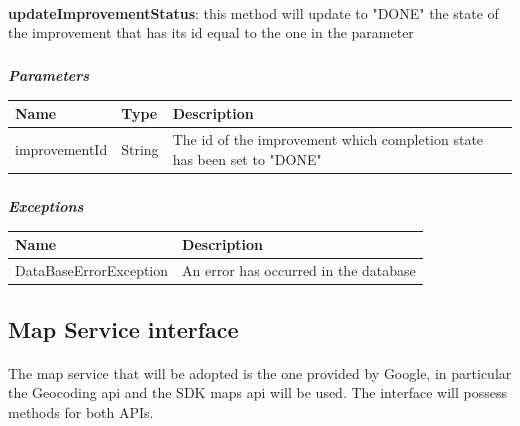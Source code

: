 						\paragraph{}
							\textbf{updateImprovementStatus}: this method will update to "DONE" the state of the improvement that has its id equal to the one in the parameter
							\subparagraph{}
							\vspace{-3mm}
							\textit{\textbf{Parameters}}
							\vspace{-2mm}
								\begin{table}[!h]
									\begin{tabular}{L{0.22\textwidth}L{0.15\textwidth}L{0.43\textwidth}}
										\toprule
										\textbf{Name} & \textbf{Type} & \textbf{Description} \\
										\midrule
								  		improvementId & String & The id of the improvement which completion state has been set to "DONE" \\
								 		\bottomrule
									\end{tabular}
								\end{table}
							\subparagraph{}
							\vspace{-6mm}
								\textit{\textbf{Exceptions}}
								\vspace{-2mm}
									\begin{table}[!h]
									\begin{tabular}{ll}
										\toprule
										\textbf{Name} & \textbf{Description} \\
										\midrule
								  		DataBaseErrorException & An error has occurred in the database \\ 
								 		\bottomrule
									\end{tabular}
								\end{table}
								
			\subsection{Map Service interface}
				\paragraph{}
					The map service that will be adopted is the one provided by Google, in particular the Geocoding api and the SDK maps api will be used. The interface will possess methods for both APIs.
					
